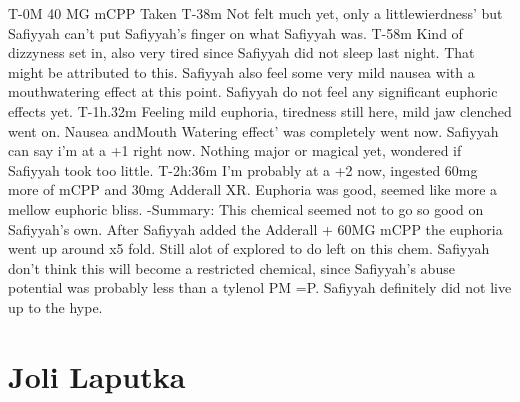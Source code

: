 \documentclass[12pt]{book}
\begin{document}
T-0M 40 MG mCPP Taken T-38m Not felt much yet, only a littlewierdness' but Safiyyah can't put Safiyyah's finger on what Safiyyah was. T-58m Kind of dizzyness set in, also very tired since Safiyyah did not sleep last night. That might be attributed to this. Safiyyah also feel some very mild nausea with a mouthwatering effect at this point. Safiyyah do not feel any significant euphoric effects yet. T-1h.32m Feeling mild euphoria, tiredness still here, mild jaw clenched went on. Nausea andMouth Watering effect' was completely went now. Safiyyah can say i'm at a +1 right now. Nothing major or magical yet, wondered if Safiyyah took too little. T-2h:36m I'm probably at a +2 now, ingested 60mg more of mCPP and 30mg Adderall XR. Euphoria was good, seemed like more a mellow euphoric bliss. -Summary: This chemical seemed not to go so good on Safiyyah's own. After Safiyyah added the Adderall + 60MG mCPP the euphoria went up around x5 fold. Still alot of explored to do left on this chem. Safiyyah don't think this will become a restricted chemical, since Safiyyah's abuse potential was probably less than a tylenol PM =P. Safiyyah definitely did not live up to the hype.



\chapter{Joli Laputka}
\end{document}
